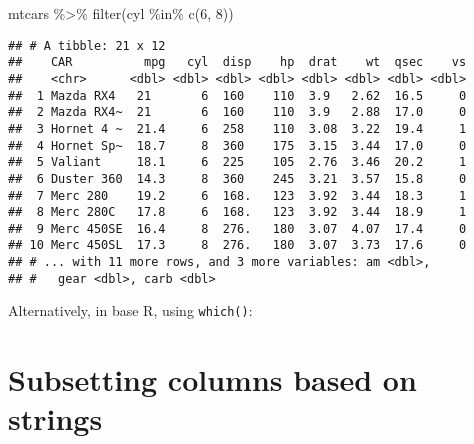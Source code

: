 \documentclass[
]{book}
\newenvironment{Shaded}{\begin{snugshade}}{\end{snugshade}}
\newcommand{\CommentTok}[1]{\textcolor[rgb]{0.56,0.35,0.01}{\textit{#1}}}
\newcommand{\DecValTok}[1]{\textcolor[rgb]{0.00,0.00,0.81}{#1}}
\newcommand{\FunctionTok}[1]{\textcolor[rgb]{0.00,0.00,0.00}{#1}}
\newcommand{\NormalTok}[1]{#1}
\newcommand{\SpecialCharTok}[1]{\textcolor[rgb]{0.00,0.00,0.00}{#1}}
\begin{document}
\begin{Shaded}
\begin{Highlighting}[]
\NormalTok{mtcars }\SpecialCharTok{\%\textgreater{}\%} \FunctionTok{filter}\NormalTok{(cyl }\SpecialCharTok{\%in\%} \FunctionTok{c}\NormalTok{(}\DecValTok{6}\NormalTok{, }\DecValTok{8}\NormalTok{))}
\end{Highlighting}
\end{Shaded}

\begin{verbatim}
## # A tibble: 21 x 12
##    CAR          mpg   cyl  disp    hp  drat    wt  qsec    vs
##    <chr>      <dbl> <dbl> <dbl> <dbl> <dbl> <dbl> <dbl> <dbl>
##  1 Mazda RX4   21       6  160    110  3.9   2.62  16.5     0
##  2 Mazda RX4~  21       6  160    110  3.9   2.88  17.0     0
##  3 Hornet 4 ~  21.4     6  258    110  3.08  3.22  19.4     1
##  4 Hornet Sp~  18.7     8  360    175  3.15  3.44  17.0     0
##  5 Valiant     18.1     6  225    105  2.76  3.46  20.2     1
##  6 Duster 360  14.3     8  360    245  3.21  3.57  15.8     0
##  7 Merc 280    19.2     6  168.   123  3.92  3.44  18.3     1
##  8 Merc 280C   17.8     6  168.   123  3.92  3.44  18.9     1
##  9 Merc 450SE  16.4     8  276.   180  3.07  4.07  17.4     0
## 10 Merc 450SL  17.3     8  276.   180  3.07  3.73  17.6     0
## # ... with 11 more rows, and 3 more variables: am <dbl>,
## #   gear <dbl>, carb <dbl>
\end{verbatim}

Alternatively, in base R, using \texttt{which()}:

\begin{Shaded}
\end{Shaded}

\hypertarget{subsetting-columns-based-on-strings}{%
\section{Subsetting columns based on strings}\label{subsetting-columns-based-on-strings}}
\end{document}
